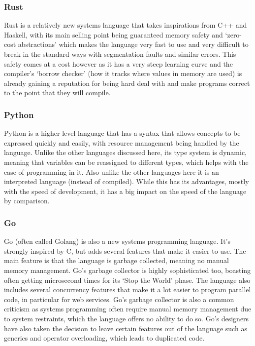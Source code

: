 \subsubsection{Rust}
Rust is a relatively new systems language that takes inspirations from C++ and
Haskell, with its main selling point being guaranteed memory safety and
`zero-cost abstractions' which makes the language very fast to use and very
difficult to break in the standard ways with segmentation faults and similar
errors. This safety comes at a cost however as it has a very steep learning
curve and the compiler's `borrow checker' (how it tracks where values in memory
are used) is already gaining a reputation for being hard deal with and make
programs correct to the point that they will compile.

\subsubsection{Python}
Python is a higher-level language that has a syntax that allows concepts to be
expressed quickly and easily, with resource management being handled by the
language. Unlike the other languages discussed here, its type system is dynamic,
meaning that variables can be reassigned to different types, which helps with
the ease of programming in it. Also unlike the other languages here
it is an interpreted language (instead of compiled). While this has its
advantages, mostly with the speed of development, it has a big impact on the
speed of the language by comparison.

\subsubsection{Go}
Go (often called Golang) is also a new systems programming language. It's
strongly inspired by C, but adds several features that make it easier to use.
The main feature is that the language is garbage collected, meaning no manual
memory management. Go's garbage collector is highly sophisticated too, boasting
often getting microsecond times for its `Stop the World' phase. The language
also includes several concurrency features that make it a lot easier to program
parallel code, in particular for web services. Go's garbage collector is also a
common criticism as systems programming often require manual memory management
due to system restraints, which the language offers no ability to do so. Go's
designers have also taken the decision to leave certain features out of the
language such as generics and operator overloading, which leads to duplicated
code.

